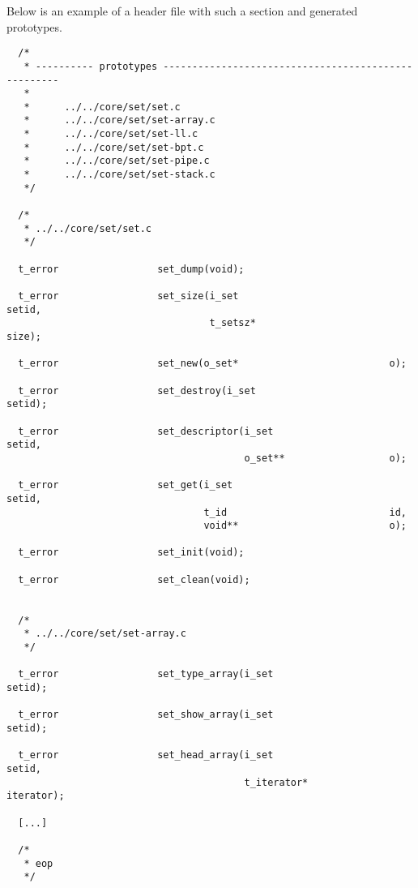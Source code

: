 Below is an example of a header file with such a 
section and generated prototypes.

\begin{verbatim}
  /*
   * ---------- prototypes ----------------------------------------------------
   *
   *      ../../core/set/set.c
   *      ../../core/set/set-array.c
   *      ../../core/set/set-ll.c
   *      ../../core/set/set-bpt.c
   *      ../../core/set/set-pipe.c
   *      ../../core/set/set-stack.c
   */

  /*
   * ../../core/set/set.c
   */

  t_error                 set_dump(void);

  t_error                 set_size(i_set                          setid,
                                   t_setsz*                       size);

  t_error                 set_new(o_set*                          o);

  t_error                 set_destroy(i_set                       setid);

  t_error                 set_descriptor(i_set                    setid,
                                         o_set**                  o);

  t_error                 set_get(i_set                           setid,
                                  t_id                            id,
                                  void**                          o);

  t_error                 set_init(void);

  t_error                 set_clean(void);


  /*
   * ../../core/set/set-array.c
   */

  t_error                 set_type_array(i_set                    setid);

  t_error                 set_show_array(i_set                    setid);

  t_error                 set_head_array(i_set                    setid,
                                         t_iterator*              iterator);

  [...]

  /*
   * eop
   */
\end{verbatim}
